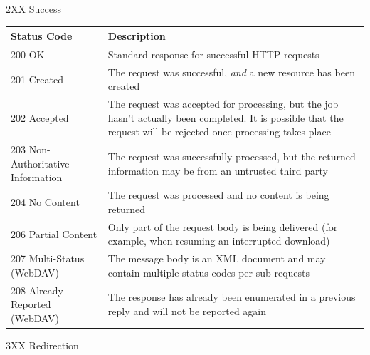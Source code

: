 \documentclass[final,table]{beamer}
\begin{document}
\begin{frame}{}
\begin{block}{\huge 2XX Success}
      \vspace{0.3in}

      \begin{tabular}{p{} p{}}
        Status Code & Description \\ \hline
        200 OK & Standard response for successful HTTP requests \\
        201 Created & The request was successful, \emph{and} a new resource has been created \\
        202 Accepted & The request was accepted for processing, but the job hasn't actually been completed. It is possible that the request will be rejected once processing takes place \\
        203 Non-Authoritative Information & The request was successfully processed, but the returned information may be from an untrusted third party \\
        204 No Content & The request was processed and no content is being returned \\
        206 Partial Content & Only part of the request body is being delivered (for example, when resuming an interrupted download) \\
        207 Multi-Status (WebDAV) & The message body is an XML document and may contain multiple status codes per sub-requests \\
        208 Already Reported (WebDAV) & The response has already been enumerated in a previous reply and will not be reported again\\
      \end{tabular}
    \end{block}
    \begin{block}{\huge 3XX Redirection}

      \vspace{0.3in}


\end{block}
\end{frame}
\end{document}
